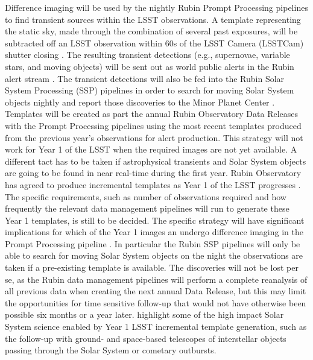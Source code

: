 \documentclass[preprint,linenumbers]{aastex631}
\begin{document}
	Difference imaging will be used by the nightly Rubin Prompt Processing pipelines to find  transient sources within the LSST observations. A template representing the static sky, made through the combination of several past exposures, will be subtracted off an LSST observation within 60s of the LSST Camera (LSSTCam) shutter closing \citep{lsstSRD, 2019ApJ...873..111I, LDM-612, LSE-163, RTN-011}. The resulting transient detections (e.g., supernovae, variable stars, and moving objects) will be sent out as world public alerts in the Rubin alert stream \citep{lsstSRD, 2019ApJ...873..111I, LDM-612, LSE-163, RTN-011}. The transient detections will also be fed into the Rubin Solar System Processing (SSP) pipelines in order to  search for moving Solar System objects nightly and report those discoveries to the Minor Planet Center \citep{2019ApJ...873..111I,lsstMOPS,lsstSSP}. Templates will be created as part  the annual Rubin Observatory Data Releases with  the Prompt Processing pipelines using the most recent templates produced from the previous year's observations for alert production. This strategy will not work for Year 1 of the LSST when the required images are not yet available.  A different tact has to be taken if astrophysical transients and Solar System objects are going to be found in near real-time during the first year.  Rubin Observatory has agreed to produce incremental templates as Year 1 of the LSST progresses \citep{RTN-011}. 
	The specific requirements, such as number of observations required and how frequently the relevant data management pipelines will run to generate these Year 1 templates, is still to be decided. The specific strategy  will have significant implications for which of the Year 1 images an undergo difference imaging in the Prompt Processing pipeline \citep{DMTN-107,RTN-011}. 
	In particular the Rubin SSP pipelines will only be able to search for moving Solar System objects on the night the observations are taken if a pre-existing template is available. 
	The discoveries will not be lost per se, as the Rubin data management pipelines will perform a complete reanalysis of all previous data when creating the next annual Data Release, but  this may limit the opportunities for time sensitive follow-up that would not have otherwise been possible six months or a year later. \cite{2021RNAAS...5..143S} highlight some of the high impact Solar System science enabled by Year 1 LSST incremental template generation, such as the follow-up with ground- and space-based telescopes of interstellar objects passing through the Solar System or cometary outbursts. 
	
\end{document}
